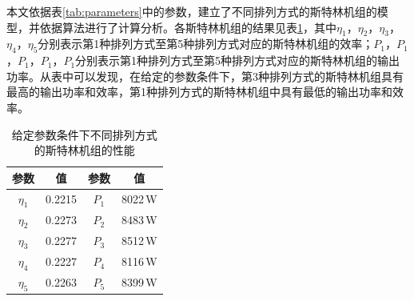 本文依据表\ref{tab:parameters}中的参数，建立了不同排列方式的斯特林机组的模型，并依据算法进行了计算分析。各斯特林机组的结果见表\ref{tab:result}，其中$\eta_1$，$\eta_2$，$\eta_3$，$\eta_4$，$\eta_5$分别表示第1种排列方式至第5种排列方式对应的斯特林机组的效率；$P_1$，$P_1$，$P_1$，$P_1$，$P_1$分别表示第1种排列方式至第5种排列方式对应的斯特林机组的输出功率。从表中可以发现，在给定的参数条件下，第3种排列方式的斯特林机组具有最高的输出功率和效率，第1种排列方式的斯特林机组中具有最低的输出功率和效率。

\begin{table}[htbp]
	\caption{给定参数条件下不同排列方式的斯特林机组的性能}
	\begin{center}
	\begin{tabular}{cccc}
		\toprule
		参数		&	值	&	参数		&	值\\
		\midrule
		$\eta_1$	&	0.2215	&	$P_1$		&	8022\,W\\
		$\eta_2$	&	0.2273	&	$P_2$		&	8483\,W\\
		$\eta_3$	&	0.2277	&	$P_3$		&	8512\,W\\
		$\eta_4$	&	0.2227	&	$P_4$		&	8116\,W\\
		$\eta_5$	&	0.2263	&	$P_5$		&	8399\,W\\		
		\bottomrule
	\end{tabular}
	\end{center}
	\label{tab:result}
\end{table}

